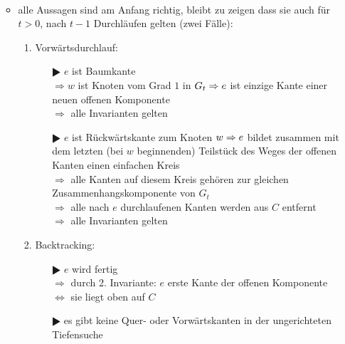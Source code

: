 \topbreak
\vspace*{-3.75\baselineskip}
\begin{itemize}
	\item[]\ \\
		\begin{itemize}
				\item alle Aussagen sind am Anfang richtig, bleibt zu zeigen dass sie auch für $t>0$, nach $t-1$ Durchläufen gelten (zwei Fälle):
					\begin{enumerate}
						\item Vorwärtsdurchlauf:\\
							\begin{minipage}{0.3\textwidth}
							
							\end{minipage}
							\begin{minipage}{0.55\textwidth}
								\begin{itemize}[itemsep=-1pt]
									\item[$\RHD$] $e$ ist Baumkante\\
									$\Rightarrow w$ ist Knoten vom Grad $1$ in $G_t\\
									\Rightarrow e$ ist einzige Kante einer neuen offenen Komponente\\
									$\Rightarrow$ alle Invarianten gelten
									\item[$\RHD$] $e$ ist Rückwärtskante zum Knoten $w\\
									\Rightarrow e$ bildet zusammen mit dem letzten (bei $w$ beginnenden) Teilstück des Weges der offenen Kanten einen einfachen Kreis\\
									$\Rightarrow$ alle Kanten auf diesem Kreis gehören zur gleichen Zusammenhangskomponente von $G_t$\\
									$\Rightarrow$ alle nach $e$ durchlaufenen Kanten werden aus $C$ entfernt\\
									$\Rightarrow$ alle Invarianten gelten
								\end{itemize}
							\end{minipage}
						\item Backtracking:
							\begin{itemize}[itemsep=-1pt]
								\item[$\RHD$] $e$ wird fertig\\
								$\Rightarrow$ durch 2. Invariante: $e$ erste Kante der offenen Komponente $\Leftrightarrow$ sie liegt oben auf $C$
								\item[$\RHD$] es gibt keine Quer- oder Vorwärtskanten in der ungerichteten Tiefensuche\\

\end{itemize}
\end{enumerate}
\end{itemize}
\end{itemize}
